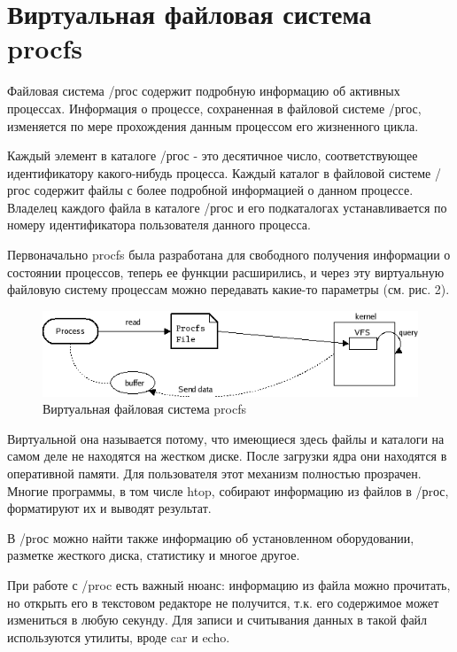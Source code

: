 \documentclass[a4paper, 12pt]{article}		%
\begin{document}
\newpage
\section{Виртуальная файловая система procfs}

Файловая система /ргос содержит подробную информацию об активных процессах. Информация о процессе, сохраненная в файловой системе /ргос, изменяется по мере прохождения данным процессом его жизненного цикла.

Каждый элемент в каталоге /ргос - это десятичное число, соответствующее идентификатору какого-нибудь процесса. Каждый каталог в файловой системе /ргос содержит файлы с более подробной информацией о данном процессе. Владелец каждого файла в каталоге /ргос и его подкаталогах устанавливается по номеру идентификатора пользователя данного процесса.

Первоначально procfs была разработана для свободного получения  информации о состоянии процессов, теперь ее функции расширились, и через эту виртуальную файловую систему процессам можно передавать какие-то параметры (см. рис. 2).

\begin{figure}[h!]
\centering
\includegraphics[scale=0.9]{res/ProcessFileSystem}
\caption{Виртуальная файловая система procfs}
\end{figure}

Виртуальной она называется потому, что имеющиеся здесь файлы и каталоги на самом деле не находятся на жестком диске. После загрузки ядра они находятся в оперативной памяти. Для пользователя этот механизм полностью  прозрачен. Многие программы, в  том числе htop, собирают информацию из  файлов  в  /рrос, форматируют их и выводят результат.

В /рrос можно найти  также  информацию об установленном оборудовании,  разметке  жесткого диска, статистику и  многое другое.

При работе с /proc есть важный нюанс: информацию  из  файла можно прочитать, но открыть его в текстовом редакторе не получится, т.к. его содержимое может измениться в любую секунду. Для записи  и  считывания данных в  такой  файл используются утилиты, вроде car и echo.
\end{document}
